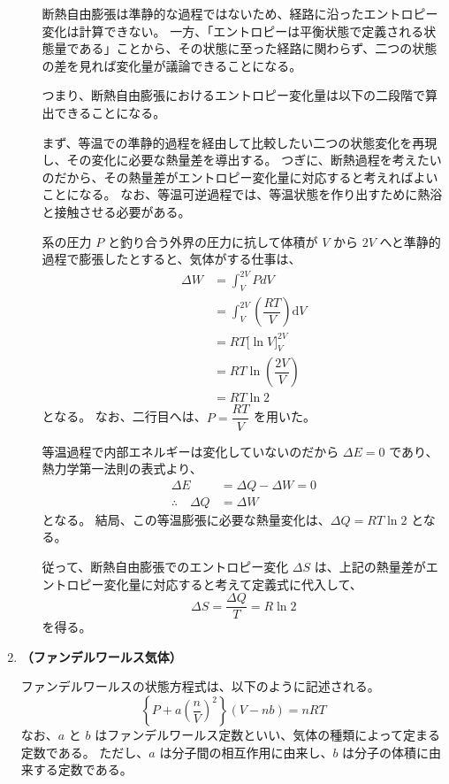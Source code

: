 \documentclass[uplatex,dvipdfmx,a4paper,11pt]{jsarticle}
\newcommand{\diff}{\mathrm d}
\begin{document}
\begin{appendix}
\begin{enumerate}
\begin{enumerate}

断熱自由膨張は準静的な過程ではないため、経路に沿ったエントロピー変化は計算できない。
一方、「エントロピーは平衡状態で定義される状態量である」ことから、その状態に至った経路に関わらず、二つの状態の差を見れば変化量が議論できることになる。

つまり、断熱自由膨張におけるエントロピー変化量は以下の二段階で算出できることになる。

まず、等温での準静的過程を経由して比較したい二つの状態変化を再現し、その変化に必要な熱量差を導出する。
つぎに、断熱過程を考えたいのだから、その熱量差がエントロピー変化量に対応すると考えればよいことになる。
なお、等温可逆過程では、等温状態を作り出すために熱浴と接触させる必要がある。

系の圧力 $P$ と釣り合う外界の圧力に抗して体積が $V$ から $2V$ へと準静的過程で膨張したとすると、気体がする仕事は、
\begin{align*}
\Delta W 
	&= \int_V^{2V} PdV \\
	&= \int_V^{2V} \left(\dfrac{RT}{V} \right) \diff V \\[8pt]
	&= RT \Big[\ln{V} \Big]_V^{2V} \\[8pt]
	&= RT \ln \left(\dfrac{2V}{V} \right) \\
	&= RT \ln 2
\end{align*}
となる。
なお、二行目へは、$P=\dfrac{RT}{V}$ を用いた。

等温過程で内部エネルギーは変化していないのだから $\Delta E = 0$ であり、熱力学第一法則の表式より、
\begin{align*}
\Delta E &= \Delta Q - \Delta W =0 \\
\therefore \quad \Delta Q &= \Delta W 
\end{align*}
となる。
結局、この等温膨張に必要な熱量変化は、$\Delta Q = RT \ln 2$ となる。

従って、断熱自由膨張でのエントロピー変化 $\Delta S$ は、上記の熱量差がエントロピー変化量に対応すると考えて定義式に代入して、
\begin{equation*}
\Delta S= \dfrac{\Delta Q}{T} = R \ln 2
\end{equation*}
を得る。

\end{enumerate}
%
\item
{\bf （ファンデルワールス気体）}

ファンデルワールスの状態方程式は、以下のように記述される。
\begin{equation*}
	\left\{ P + a \left(\dfrac{n}{V} \right)^2 \right\} \left(V - nb \right) = nRT
        \label{eq:van_der_Waals}
\end{equation*}
なお、$a$ と $b$ はファンデルワールス定数といい、気体の種類によって定まる定数である。
ただし、$a$ は分子間の相互作用に由来し、$b$ は分子の体積に由来する定数である。


\end{enumerate}
\end{appendix}
\end{document}
